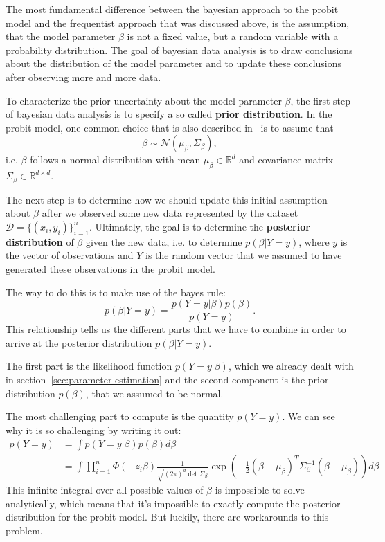 The most fundamental difference between the bayesian approach to
the probit model and the frequentist approach that was discussed above,
is the assumption, that the model parameter $\beta$ is not a fixed
value, but a random variable with a probability distribution.
The goal of bayesian data analysis is to draw conclusions about
the distribution of the model parameter and to update these
conclusions after observing more and more data.

To characterize the prior uncertainty about the model parameter $\beta$,
the first step of bayesian data analysis is to specify a so called
\textbf{prior distribution}.
In the probit model, one common choice that is also described
in~\cite{regression-fahrmeir} is to assume that
\begin{equation}
    \beta \sim \mathcal{N}(\mu_\beta, \Sigma_\beta),
\end{equation}
i.e. $\beta$ follows a normal distribution with mean
$\mu_\beta \in \mathbb{R}^d$ and
covariance matrix $\Sigma_\beta \in \mathbb{R}^{d \times d}$.

The next step is to determine how we should update this initial
assumption about $\beta$ after we observed some new data
represented by the dataset $\mathcal{D} = \{(x_i, y_i)\}_{i=1}^n$.
Ultimately, the goal is to determine the
\textbf{posterior distribution} of $\beta$ given the new data,
i.e. to determine $p(\beta | Y=y)$, where $y$ is the
vector of observations and $Y$ is the random vector that we
assumed to have generated these observations in the probit model.

The way to do this is to make use of the bayes rule:
\begin{equation}
    p(\beta | Y=y) = \frac{p(Y=y | \beta) p(\beta)}{p(Y=y)}.
\end{equation}
This relationship tells us the different parts that we have to combine
in order to arrive at the posterior distribution $p(\beta | Y=y)$.

The first part is the likelihood function $p(Y=y|\beta)$,
which we already dealt with in section~\ref{sec:parameter-estimation} and
the second component is the prior distribution $p(\beta)$,
that we assumed to be normal.

The most challenging part to compute is the quantity $p(Y=y)$.
We can see why it is so challenging by writing it out:
\begin{equation}
    \begin{split}
        p(Y=y) &= \int p(Y=y|\beta)p(\beta) d\beta \\
        &= \int \prod_{i=1}^n \Phi(- z_i \beta)
        \frac{1}{\sqrt{(2\pi)^d \det{\Sigma_\beta}}}
        \exp{\left(-\frac{1}{2}(\beta - \mu_\beta)^T \Sigma_\beta^{-1}(\beta - \mu_\beta)\right)} d\beta
    \end{split}
\end{equation}
This infinite integral over all possible values of $\beta$
is impossible to solve analytically, which means that
it's impossible to exactly compute the posterior distribution
for the probit model.
But luckily, there are workarounds to this problem.

